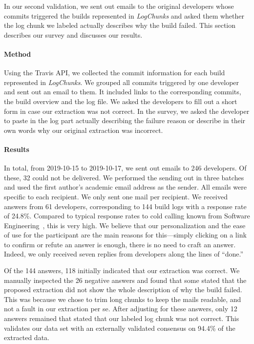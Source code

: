 \documentclass[sigconf]{acmart}
\newcommand{\logchunks}{\emph{LogChunks}\xspace}
\begin{document}
In our second validation, we sent out emails to the original
developers whose commits triggered the builds represented in
\logchunks and asked them whether the log chunk we labeled
actually describes why the build failed.  This section describes our
survey and discusses our results.

\paragraph{Method}
Using the Travis API, we collected the commit information for each build represented in \logchunks.
We grouped all commits triggered by one developer and sent out an email to them. 
It included links to the corresponding commits, the build overview and the log file.
We asked the developers to fill out a short form in case our extraction was not correct.
In the survey, we asked the developer to paste in the log part actually describing the failure reason or describe in their own words why our original extraction was incorrect.

\paragraph{Results}
In total, from 2019-10-15 to 2019-10-17, we sent out emails to 246 developers. Of these, 32 could
not be delivered. We performed the sending out in three batches and used the first author's academic email address as the sender. All emails were specific to each recipient. We only sent one mail per recipient. We received answers from 61 developers, corresponding to
144 build logs with a response rate of 24.8\%. Compared to typical response rates to cold calling known from Software Engineering~\cite{smith2013improving}, this is very high. We believe that our personalization and the ease of use for the participant are the main reasons for this---simply clicking on a link to confirm or refute an answer is enough, there is no need to craft an answer. Indeed, we only received seven replies from developers along the lines of ``done.''

Of the 144 answers, 118 initially indicated that our extraction was correct.
We manually inspected the 26 negative answers and found that some stated that the proposed extraction did not show the whole description of why the build failed.
This was because we chose to trim long chunks to keep the mails readable, and not a fault in our extraction per se. After adjusting for these answers, only 12 answers remained that stated that our labeled log chunk was not correct. This validates our data set with an externally validated consensus on 94.4\% of the extracted data.
\end{document}
